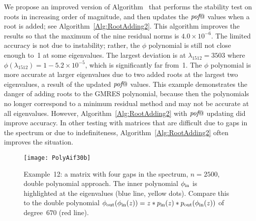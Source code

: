 \documentclass{siamart}
\makeatletter
\def\pof{\mbox{{\it pof}}@}
\makeatother
\begin{document}
We propose an improved version of Algorithm~\cite[alg.~2]{PPGStable} that performs the stability test on roots in increasing order of magnitude, and then updates the $\pof$ values when a root is added; see Algorithm~\ref{Alg:RootAdding2}.  This algorithm improves the results so that the maximum of the nine residual norms is $4.0\times 10^{-6}$.  The limited accuracy is not due to instability; rather, the $\phi$ polynomial is still not close enough to~1 at some eigenvalues.  The largest deviation is at $\lambda_{1512}=3503$ where $\phi(\lambda_{1512}) = 1-5.2\times 10^{-5}$, which is significantly far from~1.  
The $\phi$ polynomial is more accurate at larger eigenvalues due to two added roots at the largest two eigenvalues, a result of the updated $\pof$ values.  This example demonstrates the danger of adding roots to the GMRES polynomial, because then the polynomials no longer correspond to a minimum residual method and may not be accurate at all eigenvalues. However, Algorithm~\ref{Alg:RootAdding2} with $\pof$ updating did improve accuracy.  In other testing with matrices that are difficult due to gaps in the spectrum or due to indefiniteness, Algorithm~\ref{Alg:RootAdding2} often improves the situation.  


\begin{figure}[t!]
\begin{center}
\texttt{[image: PolyAif30b]}
\end{center}
\vspace*{-5pt}
\caption{Example~12:  a matrix with four gaps in the spectrum, $n=2500$, double polynomial approach.  The inner polynomial $\phi_{\rm in}$ is highlighted at the eigenvalues (blue line, yellow dots).  Compare this to the double polynomial $\phi_{\rm out}(\phi_{\rm in}(z)) = z*p_{\rm in}(z)*p_{\rm out}(\phi_{\rm in}(z))$ of degree~$670$ (red line).}
\label{fig:GapExb}
\vspace*{-10pt}
\end{figure}
\end{document}
